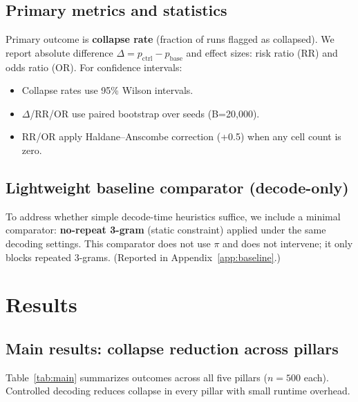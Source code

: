 \documentclass{article}
\begin{document}
\subsection{Primary metrics and statistics}
Primary outcome is \textbf{collapse rate} (fraction of runs flagged as collapsed).
We report absolute difference $\Delta = p_{\mathrm{ctrl}} - p_{\mathrm{base}}$ and effect sizes: risk ratio (RR) and odds ratio (OR).
For confidence intervals:
\begin{itemize}[leftmargin=*]
  \item Collapse rates use 95\% Wilson intervals.
  \item $\Delta$/RR/OR use paired bootstrap over seeds (B=20{,}000).
  \item RR/OR apply Haldane--Anscombe correction (+0.5) when any cell count is zero.
\end{itemize}

\subsection{Lightweight baseline comparator (decode-only)}
To address whether simple decode-time heuristics suffice, we include a minimal comparator:
\textbf{no-repeat 3-gram} (static constraint) applied under the same decoding settings.
This comparator does not use $\pi$ and does not intervene; it only blocks repeated 3-grams.
(Reported in Appendix~\ref{app:baseline}.)

\section{Results}
\subsection{Main results: collapse reduction across pillars}
Table~\ref{tab:main} summarizes outcomes across all five pillars ($n=500$ each).
Controlled decoding reduces collapse in every pillar with small runtime overhead.
\end{document}
